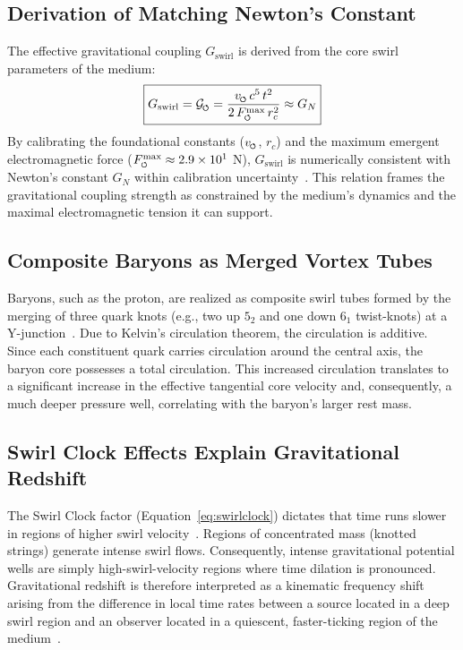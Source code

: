 \documentclass[10pt,reprint,aps,onecolumn,nofootinbib]{revtex4-2}
\newcommand{\bboxeq}[1]{\boxed{\displaystyle #1}}
\newcommand{\Fmaxswirl}{F^{\max}_{\mkern-1mu\scriptscriptstyle\boldsymbol{\circlearrowleft}}}
\begin{document}
    \subsection*{Derivation of Matching Newton's Constant}
        The effective gravitational coupling $G_\text{swirl}$ is derived from the core swirl parameters of the medium:
        \begin{equation}
            \bboxeq{
                G_{\text{swirl}}
                = \mathcal{G}_{\mkern-2mu\scriptscriptstyle\boldsymbol{\circlearrowleft}}
                = \frac{v_{\mkern-2mu\scriptscriptstyle\boldsymbol{\circlearrowleft}} \, c^5 \, t^2}{2 \, \Fmaxswirl \, r_c^2}
                \approx G_N
            }
            \label{eq:gswirl}
        \end{equation}
        By calibrating the foundational constants ($v_{\mkern-2mu\scriptscriptstyle\boldsymbol{\circlearrowleft}}$, $r_c$) and the maximum emergent electromagnetic force ($\Fmaxswirl \approx 2.9 \times 10^1$ N), $G_\text{swirl}$ is numerically consistent with Newton's constant $G_N$ within calibration uncertainty~\cite{sstCanon}. This relation frames the gravitational coupling strength as constrained by the medium’s dynamics and the maximal electromagnetic tension it can support.

    \subsection*{Composite Baryons as Merged Vortex Tubes}
        Baryons, such as the proton, are realized as composite swirl tubes formed by the merging of three quark knots (e.g., two up $5_2$ and one down $6_1$ twist-knots) at a Y-junction~\cite{chiralSwirl}. Due to Kelvin's circulation theorem, the circulation is additive. Since each constituent quark carries circulation around the central axis, the baryon core possesses a total circulation. This increased circulation translates to a significant increase in the effective tangential core velocity and, consequently, a much deeper pressure well, correlating with the baryon's larger rest mass.

    \subsection*{Swirl Clock Effects Explain Gravitational Redshift}
        The Swirl Clock factor (Equation~\ref{eq:swirlclock}) dictates that time runs slower in regions of higher swirl velocity~\cite{sstCanon}. Regions of concentrated mass (knotted strings) generate intense swirl flows. Consequently, intense gravitational potential wells are simply high-swirl-velocity regions where time dilation is pronounced. Gravitational redshift is therefore interpreted as a kinematic frequency shift arising from the difference in local time rates between a source located in a deep swirl region and an observer located in a quiescent, faster-ticking region of the medium~\cite{sstCanon}.
\end{document}
